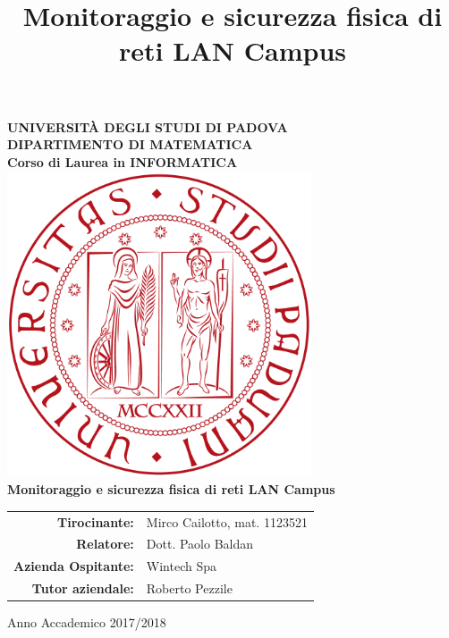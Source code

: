 \documentclass[openany, a4paper, 12pt]{report}
\title{Monitoraggio e sicurezza fisica di reti LAN Campus}
\begin{document}
\begin{titlepage}
	\centering
	\vfill
	{
		\bfseries
		\Large{UNIVERSITÀ DEGLI STUDI DI PADOVA}\\
		\large DIPARTIMENTO DI MATEMATICA\\
		\noindent\makebox[\linewidth]{\rule{16cm}{0.4pt}}
		Corso di Laurea in INFORMATICA
		\vskip1cm
		\includegraphics[width=9cm]{images/LogoPadova} \\
		\vfill
		\LARGE Monitoraggio e sicurezza fisica di reti LAN Campus
		\vfill

		\begin{table}[htbp]
			\centering
			\renewcommand\arraystretch{1.2}
			\begin{tabular}{r|l}
				\textbf{Tirocinante:} & Mirco Cailotto, mat. 1123521 \\
				\textbf{Relatore:} & Dott. Paolo Baldan \\
				\textbf{Azienda Ospitante:}	& Wintech Spa \\
				\textbf{Tutor aziendale:} & Roberto Pezzile \\
			\end{tabular}
		\end{table}
		
		\vfill
		\noindent\makebox[\linewidth]{\rule{16cm}{0.4pt}}
		\large Anno Accademico 2017/2018
		\vfill
	}    
\end{titlepage}
\clearpage\thispagestyle{empty}\mbox{}\clearpage

\clearpage\thispagestyle{empty}\mbox{}\clearpage
{}
\tableofcontents
\listoffigures


\newpage
{}






\end{document}
